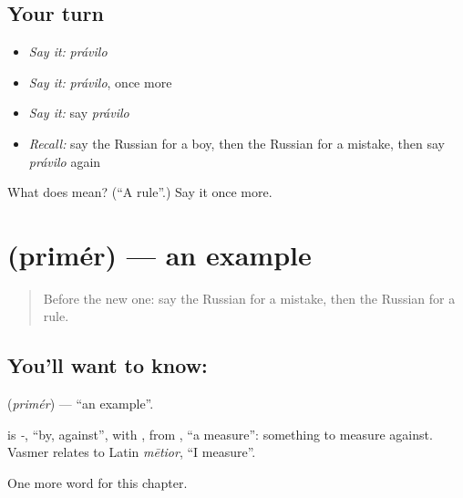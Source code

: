 \subsection*{Your turn}
\begin{itemize}
\raggedright
  \item \emph{Say it:} \emph{právilo}
  \item \emph{Say it:} \emph{právilo}, once more
  \item \emph{Say it:} say \emph{právilo}
  \item \emph{Recall:} say the Russian for a boy, then the Russian for a mistake, then say \emph{právilo} again
\end{itemize}

\begin{tcolorbox}[breakable,colback=teal!4,colframe=teal!35!black,title={Before you move on}]
What does  mean? (\textquotedblleft{}A rule\textquotedblright{}.) Say it once more.
\end{tcolorbox}
\section[\texorpdfstring{\ru{пример} (primér)}{пример (primér)}]{ (primér) — an example}

\label{lesson:RU-C228-primer}



\begin{quote}
Before the new one: say the Russian for a mistake, then the Russian for a rule.
\end{quote}

\subsection*{You'll want to know: }
\textbf{} (\emph{primér}) — \textquotedblleft{}an example\textquotedblright{}.

\begin{cousinweb}
\textbf{} is \emph{-}, \textquotedblleft{}by, against\textquotedblright{}, with \emph{}, from \emph{}, \textquotedblleft{}a measure\textquotedblright{}: something to measure against. Vasmer relates \emph{} to Latin \emph{mētior}, \textquotedblleft{}I measure\textquotedblright{}.
\end{cousinweb}

\begin{grammarlens}[title={What you've built}]
One more word for this chapter.
\end{grammarlens}


